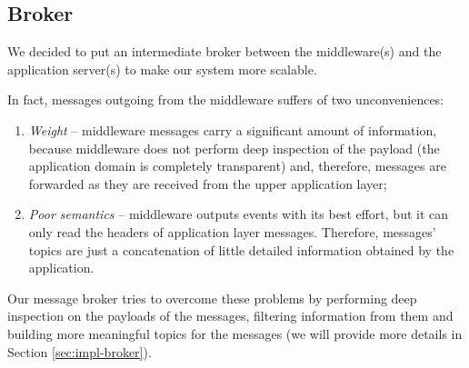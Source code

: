 \subsection{Broker}

We decided to put an intermediate broker between the middleware(s) and the
application server(s) to make our system more scalable.

In fact, messages outgoing from the middleware suffers of two unconveniences:

\begin{enumerate}
  \item \textit{Weight} -- middleware messages carry a significant amount of
    information, because middleware does not perform deep inspection of the
    payload (the application domain is completely transparent) and, therefore,
    messages are forwarded as they are received from the upper application
    layer;
  \item \textit{Poor semantics} -- middleware outputs events with its best
    effort, but it can only read the headers of application layer messages.
    Therefore, messages' topics are just a concatenation of little detailed
    information obtained by the application.
\end{enumerate}

Our message broker tries to overcome these problems by performing deep
inspection on the payloads of the messages, filtering information from them and
building more meaningful topics for the messages (we will provide more details
in Section \ref{sec:impl-broker}).
